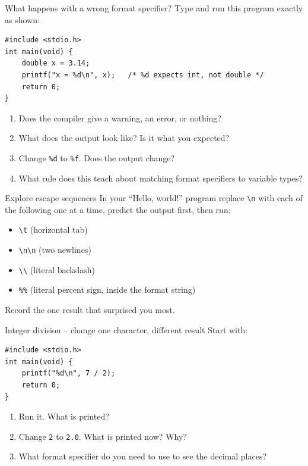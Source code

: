\documentclass[11pt]{article}
\begin{document}
\begin{tryit}{What happens with a wrong format specifier?}
Type and run this program exactly as shown:
\begin{lstlisting}
#include <stdio.h>
int main(void) {
    double x = 3.14;
    printf("x = %d\n", x);   /* %d expects int, not double */
    return 0;
}
\end{lstlisting}
\begin{enumerate}[nosep,leftmargin=*]
  \item Does the compiler give a warning, an error, or nothing?
  \item What does the output look like? Is it what you expected?
  \item Change \texttt{\%d} to \texttt{\%f}. Does the output change?
  \item What rule does this teach about matching format specifiers to variable types?
\end{enumerate}
\end{tryit}

\begin{tryit}{Explore escape sequences}
In your ``Hello, world!'' program replace \texttt{\textbackslash n} with each of the
following one at a time, predict the output first, then run:
\begin{itemize}[nosep,leftmargin=*]
  \item \texttt{\textbackslash t} \quad (horizontal tab)
  \item \texttt{\textbackslash n\textbackslash n} \quad (two newlines)
  \item \texttt{\textbackslash\textbackslash} \quad (literal backslash)
  \item \texttt{\%\%} \quad (literal percent sign, inside the format string)
\end{itemize}
Record the one result that surprised you most.
\end{tryit}

\begin{tryit}{Integer division -- change one character, different result}
Start with:
\begin{lstlisting}
#include <stdio.h>
int main(void) {
    printf("%d\n", 7 / 2);
    return 0;
}
\end{lstlisting}
\begin{enumerate}[nosep,leftmargin=*]
  \item Run it. What is printed?
  \item Change \texttt{2} to \texttt{2.0}. What is printed now? Why?
  \item What format specifier do you need to use to see the decimal places?
\end{enumerate}
\end{tryit}
\end{document}
